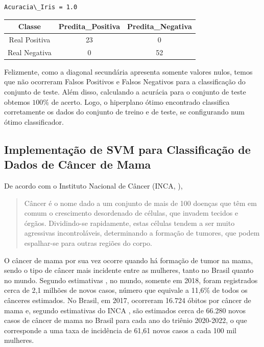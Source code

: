 \documentclass[12pt,a4paper]{scrartcl}
\theoremstyle{definition}%
\newcommand{\prompt}[4]{
        \ttfamily\llap{{\color{#2}[#3]:\hspace{3pt}#4}}\vspace{-\baselineskip}
    }
\begin{document}
    \begin{Verbatim}[commandchars=\\\{\}]
Acuracia\_Iris = 1.0
    \end{Verbatim}
 
{            
\prompt{Out}{outcolor}{25}{}
    
    \begin{tabular}{ccc}
    Classe & Predita\_Positiva & Predita\_Negativa\\
    \hline
    
    Real Positiva & 23 & 0 \\
    Real Negativa & 0 & 52 \\
\end{tabular}
\vspace{0.5cm}
}

Felizmente, como a diagonal secundária apresenta somente valores nulos,
temos que não ocorreram Falsos Positivos e Falsos Negativos para a
classificação do conjunto de teste. Além disso, calculando a acurácia
para o conjunto de teste obtemos $100\%$ de acerto. Logo, o hiperplano
ótimo encontrado classifica corretamente os dados do conjunto de treino
e de teste, se configurando num ótimo classificador.

    \hypertarget{implementauxe7uxe3o-de-svm-para-classificauxe7uxe3o-de-dados-de-cuxe2ncer-de-mama}{%
\subsection{Implementação de SVM para Classificação de Dados de Câncer
de
Mama}\label{implementauxe7uxe3o-de-svm-para-classificauxe7uxe3o-de-dados-de-cuxe2ncer-de-mama}}

De acordo com o Instituto Nacional de Câncer (INCA, \cite{Inca}), 
\begin{quote}
{\raggedleft Câncer é o nome dado a um conjunto de mais de 100 doenças que têm em comum o crescimento desordenado de células, que invadem tecidos e órgãos.
Dividindo-se rapidamente, estas células tendem a ser muito agressivas incontroláveis, determinando a formação de tumores, que podem espalhar-se para outras regiões do corpo.}
\end{quote}

O câncer de mama por sua
vez ocorre quando há formação de tumor na mama, sendo o tipo de câncer
mais incidente entre as mulheres, tanto no Brasil quanto no mundo. Segundo estimativas \cite{Inca,Femama,SocBraMastologia}, no
mundo, somente em 2018, foram registrados cerca de 2,1 milhões de novos
casos, número que equivale a 11,6\% de todos os cânceres estimados. No
Brasil, em 2017, ocorreram 16.724 óbitos por câncer de mama e, segundo
estimativas do INCA \cite{Inca}, são estimados cerca de 66.280 novos casos de câncer
de mama no Brasil para cada ano do triênio 2020-2022, o que corresponde a
uma taxa de incidência de 61,61 novos casos a cada 100 mil mulheres.
\end{document}
